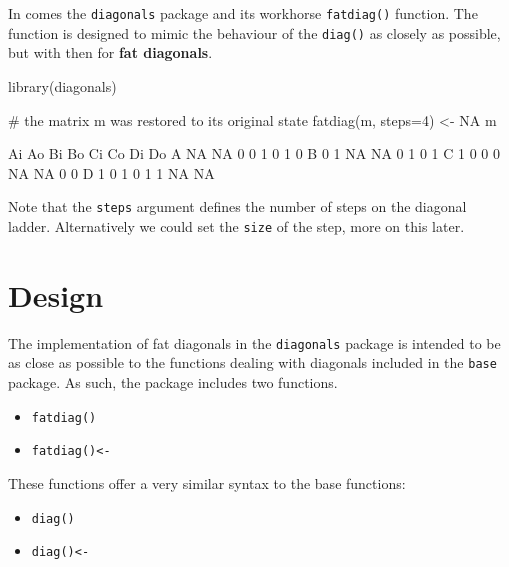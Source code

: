 \documentclass[article]{jss}
\begin{document}
In comes the \texttt{diagonals} package and its workhorse
\texttt{fatdiag()} function. The function is designed to mimic the
behaviour of the \texttt{diag()} as closely as possible, but with then
for \textbf{fat diagonals}.

\begin{CodeChunk}
\begin{CodeInput}
library(diagonals)
\end{CodeInput}
\end{CodeChunk}

\begin{CodeChunk}
\begin{CodeInput}
# the matrix m was restored to its original state
fatdiag(m, steps=4) <- NA
m
\end{CodeInput}
\begin{CodeOutput}
  Ai Ao Bi Bo Ci Co Di Do
A NA NA  0  0  1  0  1  0
B  0  1 NA NA  0  1  0  1
C  1  0  0  0 NA NA  0  0
D  1  0  1  0  1  1 NA NA
\end{CodeOutput}
\end{CodeChunk}

Note that the \texttt{steps} argument defines the number of steps on the
diagonal ladder. Alternatively we could set the \texttt{size} of the
step, more on this later.

\section{Design}\label{design}

The implementation of fat diagonals in the \texttt{diagonals} package is
intended to be as close as possible to the functions dealing with
diagonals included in the \texttt{base} package. As such, the package
includes two functions.

\begin{itemize}
\itemsep1pt\parskip0pt
\item
  \texttt{fatdiag()}
\item
  \texttt{fatdiag()\textless{}-}
\end{itemize}

These functions offer a very similar syntax to the base functions:

\begin{itemize}
\itemsep1pt\parskip0pt
\item
  \texttt{diag()}
\item
  \texttt{diag()\textless{}-}
\end{itemize}
\end{document}
